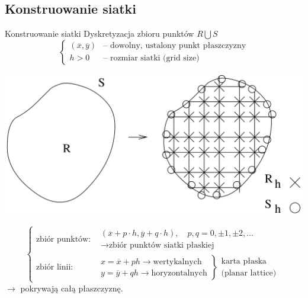 \subsection{Konstruowanie siatki}

\begin{frame}{Konstruowanie siatki}
  Dyskretyzacja zbioru punktów $R \bigcup S$
  $$ \left\{ \begin{array}{ll}
  (\overline{x}, \overline{y}) & \text{-- dowolny, ustalony punkt płaszczyzny} \\
  h > 0 & \text{-- rozmiar siatki (grid size)}
  \end{array} \right.$$
  \centerline{\includegraphics[width = \textwidth]{img/23/siatka}}
\end{frame}

\begin{frame}
  $$ \left\{ \begin{array}{ll}
  \text{zbiór punktów:} & \begin{array}{l} (\overline{x} + p \cdot h, \overline{y} + q \cdot h), \quad p,q = 0, \pm 1, \pm 2, \dots \\
    \rightarrow \text{zbiór punktów siatki płaskiej} \end{array}\\
  \text{zbiór linii:} & \left. \begin{array}{l}
    x = \overline{x} + p h \rightarrow \text{wertykalnych} \\
    y = \overline{y} + q h \rightarrow \text{horyzontalnych}
  \end{array} \right\} \begin{array}{l} \text{karta płaska} \\ \text{(planar lattice)} \end{array}
  \end{array} \right. $$
  $\rightarrow$ pokrywają całą płaszczyznę.
\end{frame}

